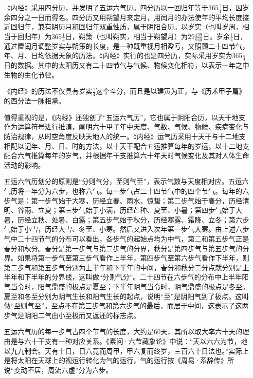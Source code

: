 \documentclass[draft,12pt]{ctexbook}
\begin{document}
《内经》采用四分历，并发明了五运六气历。四分历以一回归年等于365$\frac{1}{4}$日，因岁余四分之一日而得名。四分历又用朔望月来定月，用闰月的办法使年的平均长度接近回归年，兼有阴历月和回归年双重性质，属于阴阳合历。以岁实（也叫岁周，相当于回归年）为365$\frac{1}{4}$日，朔策（也叫朔实，相当于朔望月）为29$\frac{499}{940}$日。岁余$\frac{1}{4}$日，通过置闰月调整岁实与朔策的长度，是一种既重视月相盈亏，又照顾二十四节气，年、月、日均依据天象的历法。《内经》实行的也是四分历，实际采用岁实为365$\frac{1}{4}$日的数据。其中的太阳历又有二十四节气与气候、物候变化相符，以表示一年之中生物的生化节律。

《内经》的历法不仅具有岁实$\frac{1}{4}$这个斗分，而且是以建寅为正，与《历术甲子篇》的西分法一脉相承。

值得重视的是，《内经》还独创了“五运六气历”，它也属于阴阳合历，以天干地支作为运算符号进行推演，阐明六十甲子年中天度、气数、气候、物候、疾病变化与防治规律，从时空角度反映天地人的统一。《内经》运气历采用十天干与十二地支相配以记年、月、日、时的方法，以十天干配合五运推算每年的岁运，以十二地支配合六气推算每年的岁气，并根据年干支推算六十年天时气候变化及其对人体生命活动的影响。

五运六气历划分的原则是“分则气分，至则气至”，表示气数与天度相对应。五运六气历将一年分为六步，也称六气。每一步气占二十四节气中的四个节气。每年的六步气是：第一步气始于大寒，历经立春、雨水、惊蛰；第二步气始于春分，历经清明、谷雨、立夏；第三步气始于小满，历经芒种、夏至、小暑；第四步气始于大暑，历经立秋、处暑、白露；第五步气始于秋分，历经寒露、霜降、立冬；第六步气始于小雪，历经大雪、冬至、小寒。然后又进入次年第一步气大寒。由上述六步气中二十四节气的分布可以看出，各步气的起始点均为中气，第二和第五步气正是春分和秋分。春分是第一步气与第二步气的分界，秋分是第四步气与第五步气的分界。如果将第一步气至第三步气看作上半年，第四步气至第六步气看作下半年，则第二步气和第五步气分别为上半年和下半年的中间，春分和秋分二分点就分别是上半年和下半年的分界线，这叫做“分则气分”。二十四节在六步气的分布中上半年阳气当令时，阳气鼎盛的极点是夏至；下半年阴气当令时，阴气鼎盛的极点是冬至。夏至和冬至分别为阴气生长和阳气生长的起点，说明“至”是阴阳气到了极点。这叫做“至则气至”。至点不在第三步气和第六步气的最后，而居于中间，这表示了这两步气是阴阳二气由小至极而又返还的标志点。

五运六气历的每一步气占四个节气的长度，大约是60天，其所以取大率六十天的理由是与六十干支有一种对应关系。《素问·六节藏象论》中说：“天以六六为节，地以九九制会。天有十日，日六竟而周甲，甲六复而终岁，三百六十日法也。”实际上是将太阳在天球上的视运行转化为气的运行，气的运行按《周易·系辞传》所说“变动不居，周流六虚”分为六步。
\end{document}
